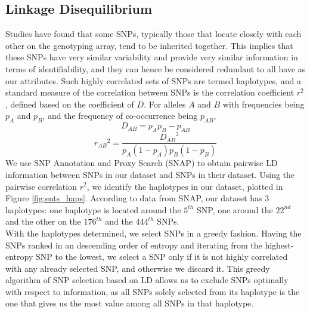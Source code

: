 \documentclass[14pt, oneside]{article}   	%
\begin{document}
\subsection{Linkage Disequilibrium}\label{sec:ld}
Studies have found that some SNPs, %
typically those that locate closely with each other on the genotyping array, tend to be inherited together.
This implies that these SNPs have very similar variability and provide very similar information in terms of identifiability,
and they can hence be considered redundant to all have as our attributes.
Such highly correlated sets of SNPs are termed haplotypes,
and a standard measure of the correlation between SNPs is the correlation coefficient $r^2$,
defined based on the coefficient of $D$.
For alleles $A$ and $B$ with frequencies being $p_A$ and $p_B$, and the frequency of co-occurrence being $p_{AB}$,
\[
D_{AB} = p_A p_B - p_{AB}
\]
\[
{r_{AB}}^2 = \frac{{D_{AB}}^2}{p_A(1-p_A)p_B(1-p_B)}
\]
We use SNP Annotation and Proxy Search (SNAP) \cite{johnson2008snap} to obtain pairwise LD information between SNPs in our dataset and SNPs in their dataset.
Using the pairwise correlation $r^2$, we identify the haplotypes in our dataset, plotted in Figure \ref{fig:ents_haps}.
According to data from SNAP, our dataset has 3 haplotypes:
one haplotype is located around the $5^{th}$ SNP, one around the $22^{nd}$ and the other on the $176^{th}$ and the $444^{th}$ SNPs.
\\
With the haplotypes determined, we select SNPs in a greedy fashion.
Having the SNPs ranked in an descending order of entropy 
and iterating from the highest-entropy SNP to the lowest,
we select a SNP only if it is not highly correlated with any already selected SNP,
and otherwise we discard it.
This greedy algorithm of SNP selection based on LD allows us to exclude SNPs optimally with respect to information,
as all SNPs solely selected from its haplotype is the one that gives us the most value among all SNPs in that haplotype.
%
%
%
%
%
%
%
%
%
%
%
%
%
%
%
%
%
%
\end{document}
